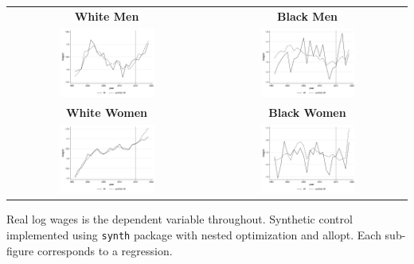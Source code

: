 \documentclass[11pt]{article}
\begin{document}
{\pagebreak
\begin{landscape}
\begin{table}[ht!]
    \centering
    \label{fig:synth_wi}
    \begin{tabular}{c c}
          \textbf{White Men} & \textbf{Black Men} \\    
          \includegraphics[width = 0.5\textwidth, keepaspectratio]{figures/fin_synth_wm_wi.png} & \includegraphics[width = 0.5\textwidth, keepaspectratio]{figures/fin_synth_bm_wi.png} \\
          \textbf{White Women} & \textbf{Black Women} \\
          \includegraphics[width = 0.5\textwidth, keepaspectratio]{figures/fin_synth_wf_wi.png} & \includegraphics[width = 0.5\textwidth, keepaspectratio]{figures/fin_synth_bf_wi.png}
    \end{tabular}
\end{table}
\footnotesize{Real log wages is the dependent variable throughout. Synthetic control implemented using \texttt{synth} package with nested optimization and allopt. Each sub-figure corresponds to a regression.}
\end{landscape}

}
\end{document}
